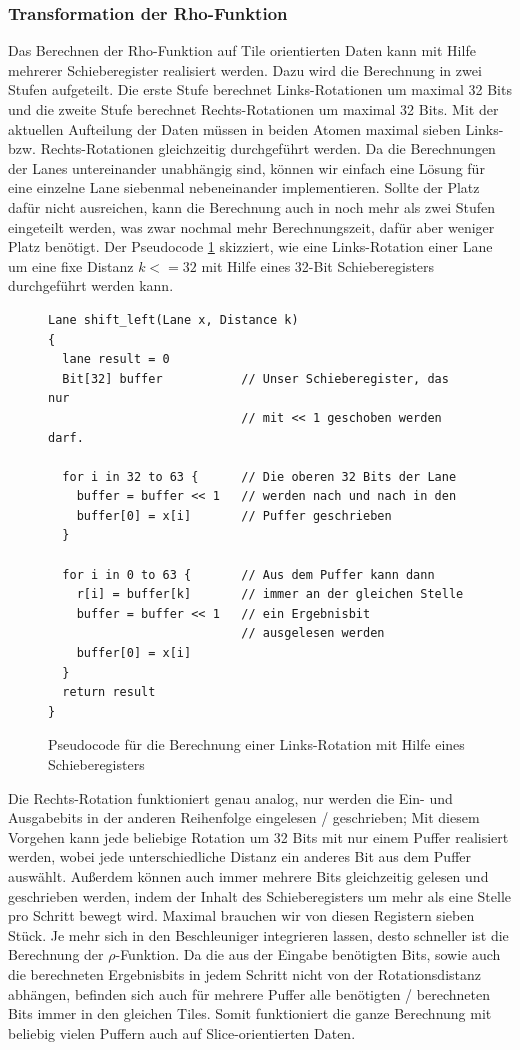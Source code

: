 \subsubsection{Transformation der Rho-Funktion}
\label{cha:iteration_2_rho_transformation}
Das Berechnen der Rho-Funktion auf Tile orientierten Daten kann mit Hilfe mehrerer Schieberegister realisiert werden.
Dazu wird die Berechnung in zwei Stufen aufgeteilt. Die erste Stufe berechnet Links-Rotationen um maximal 32 Bits
und die zweite Stufe berechnet Rechts-Rotationen um maximal 32 Bits. Mit der aktuellen Aufteilung der Daten müssen in beiden Atomen
maximal sieben Links- bzw. Rechts-Rotationen gleichzeitig durchgeführt werden. Da die Berechnungen der Lanes untereinander unabhängig sind,
können wir einfach eine Lösung für eine einzelne Lane siebenmal nebeneinander implementieren. Sollte der Platz dafür nicht ausreichen,
kann die Berechnung auch in noch mehr als zwei Stufen eingeteilt werden, was zwar nochmal mehr Berechnungszeit, dafür aber weniger Platz benötigt.
Der Pseudocode \ref{fig:iteration_2_leftshift} skizziert, wie eine Links-Rotation einer Lane um eine fixe Distanz $k <= 32$ mit Hilfe eines 32-Bit Schieberegisters
durchgeführt werden kann.
\begin{figure}
\lstset{xleftmargin=2em}
\lstset{language=C}
\begin{lstlisting}[label={lst:shift_left}]
Lane shift_left(Lane x, Distance k)
{
  lane result = 0
  Bit[32] buffer           // Unser Schieberegister, das nur
                           // mit << 1 geschoben werden darf.

  for i in 32 to 63 {      // Die oberen 32 Bits der Lane
    buffer = buffer << 1   // werden nach und nach in den
    buffer[0] = x[i]       // Puffer geschrieben
  }
  
  for i in 0 to 63 {       // Aus dem Puffer kann dann
    r[i] = buffer[k]       // immer an der gleichen Stelle
    buffer = buffer << 1   // ein Ergebnisbit
                           // ausgelesen werden
	buffer[0] = x[i]
  }
  return result
}
\end{lstlisting}
\caption{Pseudocode für die Berechnung einer Links-Rotation mit Hilfe eines Schieberegisters}
\label{fig:iteration_2_leftshift}
\end{figure}
Die Rechts-Rotation funktioniert genau analog, nur werden die Ein- und Ausgabebits in der anderen Reihenfolge eingelesen / geschrieben;
Mit diesem Vorgehen kann jede beliebige Rotation um 32 Bits mit nur einem Puffer realisiert werden, wobei jede unterschiedliche
Distanz ein anderes Bit aus dem Puffer auswählt. Außerdem können auch immer mehrere Bits gleichzeitig gelesen und geschrieben werden,
indem der Inhalt des Schieberegisters um mehr als eine Stelle pro Schritt bewegt wird.
Maximal brauchen wir von diesen Registern sieben Stück. Je mehr sich in den Beschleuniger integrieren lassen,
desto schneller ist die Berechnung der $\rho$-Funktion. Da die aus der Eingabe benötigten Bits, sowie auch die berechneten Ergebnisbits
in jedem Schritt nicht von der Rotationsdistanz abhängen, befinden sich auch für mehrere Puffer alle benötigten / berechneten Bits immer
in den gleichen Tiles. Somit funktioniert die ganze Berechnung mit beliebig vielen Puffern auch auf Slice-orientierten Daten.


